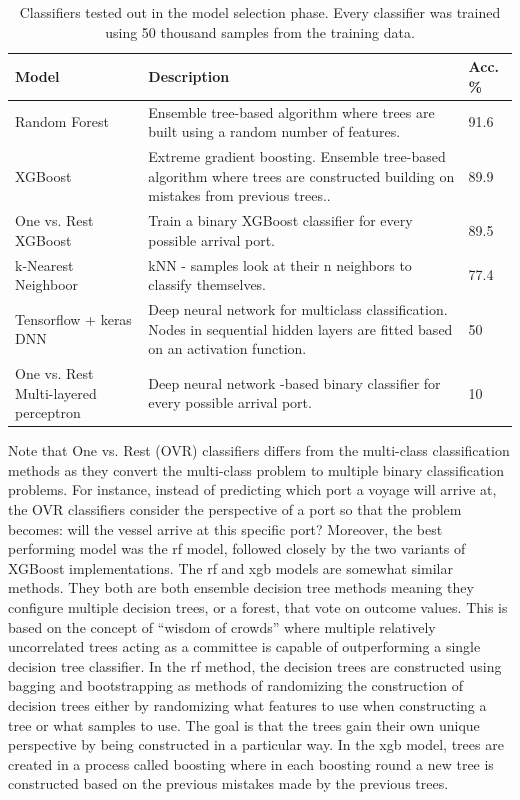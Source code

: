 \begin{table}[htbp]
    \centering
    \small{\begin{tabularx}{1.0\textwidth}{p{1.0in} X p{0.7in}}
            \bfseries{Model} & \bfseries{Description} & \bfseries{Acc. \%} \\ \toprule
            Random Forest & Ensemble tree-based algorithm where trees are built using a random number of features. & 91.6 \\ \midrule
            XGBoost & Extreme gradient boosting. Ensemble tree-based algorithm where trees are constructed building on mistakes from previous trees.. & 89.9 \\ \midrule
            One vs. Rest XGBoost & Train a binary XGBoost classifier for every possible arrival port.  & 89.5 \\ \midrule
            k-Nearest Neighboor & kNN - samples look at their n neighbors to classify themselves. & 77.4 \\ \midrule
            Tensorflow + keras DNN & Deep neural network for multiclass classification. Nodes in sequential hidden layers are fitted based on an activation function. & 50 \\ \midrule
            One vs. Rest Multi-layered perceptron & Deep neural network -based binary classifier for every possible arrival port. & 10 \\ \bottomrule
    \end{tabularx}}
\caption{Classifiers tested out in the model selection phase. Every classifier was trained using 50 thousand samples from the training data.}\label{tab:model_selection}
\end{table}


Note that One vs. Rest (OVR) classifiers differs from the multi-class classification methods as they convert the multi-class problem to multiple binary classification problems. For instance, instead of predicting which port a voyage will arrive at, the OVR classifiers consider the perspective of a port so that the problem becomes: will the vessel arrive at this specific port? Moreover, the best performing model was the \acrfull{rf} model, followed closely by the two variants of XGBoost implementations. The \acrshort{rf} and \acrshort{xgb} models are somewhat similar methods. They both are both ensemble decision tree methods meaning they configure multiple decision trees, or a forest, that vote on outcome values. This is based on the concept of ``wisdom of crowds'' where multiple relatively uncorrelated trees acting as a committee is capable of outperforming a single decision tree classifier. In the \acrshort{rf} method, the decision trees are constructed using bagging and bootstrapping as methods of randomizing the construction of decision trees either by randomizing what features to use when constructing a tree or what samples to use. The goal is that the trees gain their own unique perspective by being constructed in a particular way. In the \acrshort{xgb} model, trees are created in a process called boosting where in each boosting round a new tree is constructed based on the previous mistakes made by the previous trees.

